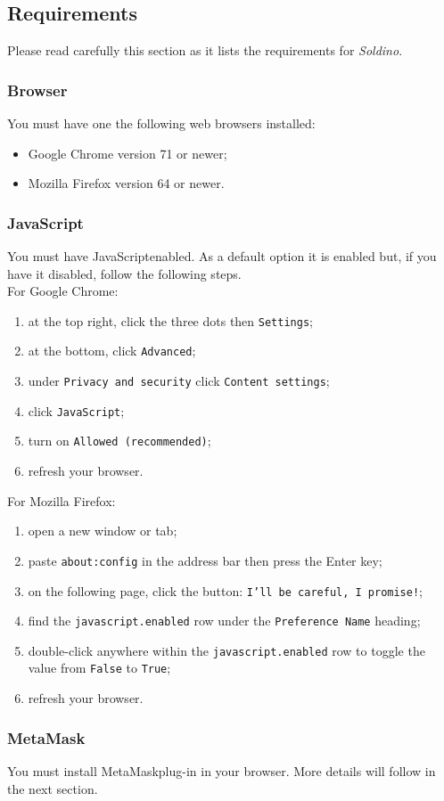 	\subsection{Requirements}
	Please read carefully this section as it lists the requirements for 
	\textit{Soldino}.
	 	\subsubsection{Browser}
		You must have one the following web browsers installed:
		\begin{itemize}
			\item Google Chrome version 71 or newer;
			\item Mozilla Firefox version 64 or newer.
		\end{itemize}
		\subsubsection{JavaScript}
		You must have JavaScript\glosp enabled. As a default option it is enabled but,
		if you have it disabled, follow the following steps.\\
		For Google Chrome:
		\begin{enumerate}
			\item at the top right, click the three dots then \texttt{Settings};
			\item at the bottom, click \texttt{Advanced};
			\item under \texttt{Privacy and security} click \texttt{Content settings};
			\item click \texttt{JavaScript};
			\item turn on 
			\texttt{Allowed (recommended)};
			\item refresh your browser.
		\end{enumerate}
		For Mozilla Firefox:
		\begin{enumerate}
			\item open a new window or tab;
			\item paste \texttt{about:config} in the address bar then press the Enter 
			key;
			\item on the following page, click the button: \texttt{I'll be careful, 
			I promise!};
			\item find the \texttt{javascript.enabled} row under the \texttt{Preference Name}
			heading;
			\item double-click anywhere within the \texttt{javascript.enabled} row to 
			toggle the value from \texttt{False} to \texttt{True};
			\item refresh your browser.
		\end{enumerate}
		\subsubsection{MetaMask}
		You must install MetaMask\glosp plug-in in your browser. More 
		details will follow in the next section. 